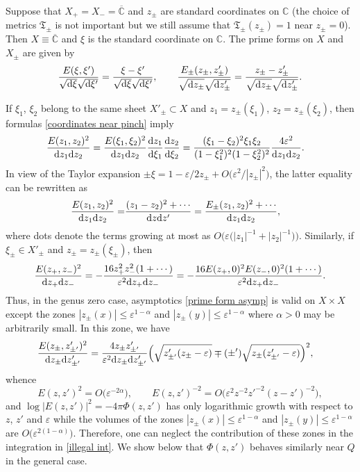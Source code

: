 \documentclass[pdftex]{sigma}
\numberwithin{equation}{section}
\theoremstyle{definition}
\begin{document}
Suppose that $X_+=X_-=\overline{\mathbb{C}}$ and $z_\pm$ are standard coordinates on $\mathbb{C}$ (the choice of metrics $\mathfrak{T}_\pm$ is not important but we still assume that $\mathfrak{T}_\pm(z_\pm)=1$ near $z_\pm=0$). Then $X\equiv\overline{\mathbb{C}}$ and $\xi$ is the standard coordinate on $\mathbb{C}$. The prime forms on $X$ and $X_\pm$ are given by
\[\frac{E(\xi,\xi')}{\sqrt{{\rm d}\xi}\sqrt{{\rm d}\xi'}}=\frac{\xi-\xi'}{\sqrt{{\rm d}\xi}\sqrt{{\rm d}\xi'}}, \qquad \frac{E_\pm(z_\pm,z'_\pm)}{\sqrt{{\rm d}z_\pm}\sqrt{{\rm d}z'_\pm}}=\frac{z_\pm-z'_\pm}{\sqrt{{\rm d}z_\pm}\sqrt{{\rm d}z'_\pm}}.\]

If $\xi_1$, $\xi_2$ belong to the same sheet $X'_\pm\subset X$ and $z_1=z_\pm(\xi_1)$, $z_2=z_\pm(\xi_2)$, then formulas \eqref{coordinates near pinch} imply
\begin{align*}
\frac{E(z_1,z_2)^2}{{\rm d}z_1{\rm d}z_2}&=\frac{E(\xi_1,\xi_2)^2}{{\rm d}z_1{\rm d}z_2}\frac{{\rm d}z_1}{{\rm d}\xi_1}\frac{{\rm d}z_2}{{\rm d}\xi_2}=\frac{(\xi_1-\xi_2)^2\xi_1\xi_2}{(1-\xi_1^2)^2(1-\xi_2^2)^2}\frac{4\varepsilon^2}{{\rm d}z_1{\rm d}z_2}.
\end{align*}
In view of the Taylor expansion $\pm\xi=1-\varepsilon/2z_{\pm}+O\bigl(\varepsilon^2/|z_{\pm}|^2\bigr)$, the latter equality can be rewritten as
\begin{align*}
\frac{E(z_1,z_2)^2}{{\rm d}z_1{\rm d}z_2}=&\frac{(z_1-z_2)^2+\cdots}{{\rm d}z{\rm d}z'}=\frac{E_\pm(z_1,z_2)^2+\cdots}{{\rm d}z_1{\rm d}z_2},
\end{align*}
where dots denote the terms growing at most as $O\bigl(\varepsilon\bigl(|z_{1}|^{-1}+|z_{2}|^{-1}\bigr)\bigr)$. Similarly, if $\xi_\pm\in X'_\pm$ and $z_\pm=z_\pm(\xi_\pm)$, then
\begin{align*}
\frac{E(z_+,z_-)^2}{{\rm d}z_+{\rm d}z_-}=-\frac{16z_+^2z_-^2(1+\cdots)}{\varepsilon^2{\rm d}z_+{\rm d}z_-}=-\frac{16E(z_+,0)^2E(z_-,0)^2(1+\cdots)}{\varepsilon^2{\rm d}z_+{\rm d}z_-}.
\end{align*}
Thus, in the genus zero case, asymptotics \eqref{prime form asymp} is valid on $X\times X$ except the zones $|z_\pm(x)|\le\varepsilon^{1-\alpha}$ and $|z_\pm(y)|\le\varepsilon^{1-\alpha}$ where $\alpha>0$ may be arbitrarily small. In this zone, we have
\begin{align*}
\frac{E(z_\pm,z'_{\pm'})^2}{{\rm d}z_\pm {\rm d}z'_{\pm'}}&=\frac{4z_\pm z'_{\pm'}}{\varepsilon^2{\rm d}z_\pm {\rm d}z'_{\pm'}}\Bigl(\sqrt{z'_{\pm'}(z_\pm -\varepsilon)}\mp(\pm')\sqrt{z_\pm (z'_{\pm'}-\varepsilon)}\Bigr)^2,
\end{align*}
whence
\[E(z,z')^2=O\bigl(\varepsilon^{-2\alpha}\bigr), \qquad E(z,z')^{-2}=O\bigl(\varepsilon^2 z^{-2}z'^{-2}(z-z')^{-2}\bigr),\]
and $\log |E(z,z')|^2=-4\pi\Phi(z,z')$ has only logarithmic growth with respect to $z$, $z'$ and $\varepsilon$ while the volumes of the zones $|z_\pm(x)|\le\varepsilon^{1-\alpha}$ and $|z_\pm(y)|\le\varepsilon^{1-\alpha}$ are $O\bigl(\varepsilon^{2(1-\alpha)}\bigr)$. Therefore, one can neglect the contribution of these zones in the integration in \eqref{illegal int}. We show below that $\Phi(z,z')$ behaves similarly near $Q$ in the general case.
\end{document}
